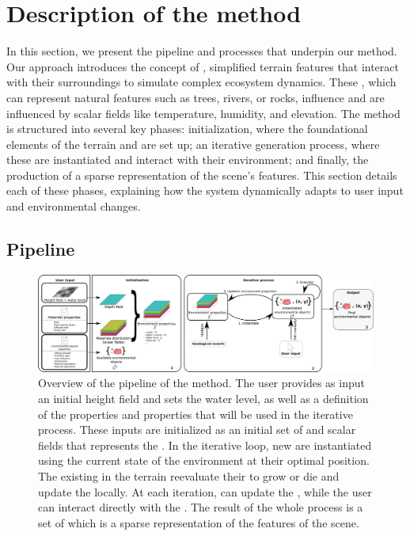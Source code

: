 \section{Description of the method}
\label{sec:semantic-representation_pipeline}

In this section, we present the pipeline and processes that underpin our method. Our approach introduces the concept of , simplified terrain features that interact with their surroundings to simulate complex ecosystem dynamics. These , which can represent natural features such as trees, rivers, or rocks, influence and are influenced by scalar fields like temperature, humidity, and elevation. The method is structured into several key phases: initialization, where the foundational elements of the terrain and  are set up; an iterative generation process, where these  are instantiated and interact with their environment; and finally, the production of a sparse representation of the scene's features. This section details each of these phases, explaining how the system dynamically adapts to user input and environmental changes.

\subsection{Pipeline}

\begin{figure}
    \includegraphics{Figures/pipeline.pdf}
    \caption{Overview of the pipeline of the method. The user provides as input an initial height field and sets the water level, as well as a definition of the  properties and  properties that will be used in the iterative process. These inputs are initialized as an initial set of  and scalar fields that represents the . In the iterative loop, new  are instantiated using the current state of the environment at their optimal position. The existing  in the terrain reevaluate their  to grow or die and update the  locally. At each iteration,  can update the , while the user can interact directly with the . The result of the whole process is a set of  which is a sparse representation of the features of the scene. }
    \label{fig:semantic-representation_pipeline}
\end{figure}

